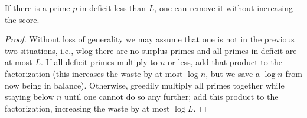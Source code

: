 \begin{sublemma}
\label{score-lower-3}
\leanok
If there is a prime $p$ in deficit less than $L$, one can remove it without increasing the score.
\end{sublemma}
\begin{proof}
\leanok
Without loss of generality we may assume that one is not in the previous two
  situations, i.e., wlog there are no surplus primes and all primes in deficit are at most $L$.
  If all deficit primes multiply to $n$ or less, add that product to the factorization (this
  increases the waste by at most $\log n$, but we save a $\log n$ from now being in balance).
  Otherwise, greedily multiply all primes together while staying below $n$ until one cannot do so
  any further; add this product to the factorization, increasing the waste by at most $\log L$.
\end{proof}
